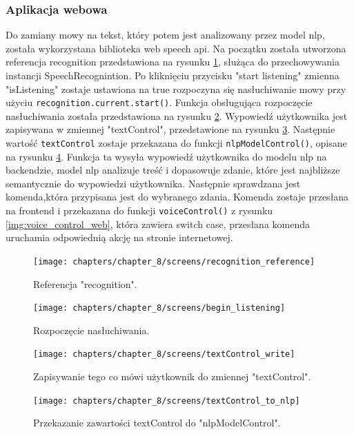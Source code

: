 \subsubsection{Aplikacja webowa}
Do zamiany mowy na tekst, który potem jest analizowany przez model nlp, została wykorzystana biblioteka web speech api. Na początku została utworzona referencja recognition przedstawiona na rysunku \ref{img:recognition_reference}, służąca do przechowywania instancji SpeechRecognintion. Po kliknięciu przycisku "start listening" zmienna "isListening" zostaje ustawiona na true rozpoczyna się nasłuchiwanie mowy przy użyciu \texttt{recognition.current.start()}. Funkcja obsługująca rozpoczęcie nasłuchiwania została przedstawiona na rysunku \ref{img:begin_listening}. Wypowiedź użytkownika jest zapisywana w zmiennej "textControl", przedstawione na rysunku \ref{img:textControl_write}. Następnie wartość \texttt{textControl} zostaje przekazana do funkcji \texttt{nlpModelControl()}, opisane na rysunku \ref{img:textControl_to_nlp}. Funkcja ta wysyła wypowiedź użytkownika do modelu nlp na backendzie, model nlp analizuje treść i dopasowuje  zdanie, które jest najbliższe semantycznie do wypowiedzi użytkownika. Następnie sprawdzana jest komenda,która przypisana jest do wybranego zdania. Komenda zostaje przesłana na frontend i przekazana do funkcji \texttt{voiceControl()} z rysunku \ref{img:voice_control_web}, która zawiera switch case, przesłana komenda uruchamia odpowiednią akcję na stronie internetowej.


\begin{figure}[H]
    \centering
    \texttt{[image: chapters/chapter\_8/screens/recognition\_reference]}
    \caption{Referencja "recognition".}
    \label{img:recognition_reference}
\end{figure}


\begin{figure}[H]
    \centering
    \texttt{[image: chapters/chapter\_8/screens/begin\_listening]}
    \caption{Rozpoczęcie nasłuchiwania.}
    \label{img:begin_listening}
\end{figure}

\begin{figure}[H]
    \centering
    \texttt{[image: chapters/chapter\_8/screens/textControl\_write]}
    \caption{Zapisywanie tego co mówi użytkownik do zmiennej "textControl".}
    \label{img:textControl_write}
\end{figure}



\begin{figure}[H]
    \centering
    \texttt{[image: chapters/chapter\_8/screens/textControl\_to\_nlp]}
    \caption{Przekazanie zawartości textControl do "nlpModelControl".}
    \label{img:textControl_to_nlp}
\end{figure}

